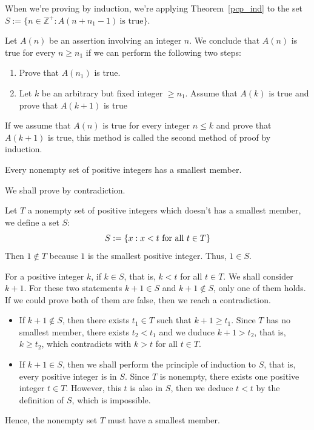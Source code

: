     \begin{remarkenv}
		When we're proving by induction, we're applying Theorem~\ref{pcp_ind} to the set $S:=\{n\in \mathbb{Z}^+:A(n+n_1-1)\ \text{is true}\}$.
	\end{remarkenv}
	\begin{methodenv}\label{prove_by_indu}
		Let $A(n)$ be an assertion involving an integer $n$. We conclude that $A(n)$ is true for every $n\ge n_1$ if we can perform the following two steps:
		\begin{enumerate}
			\item Prove that $A(n_1)$ is true.
			\item Let $k$ be an arbitrary but fixed integer $\ge n_1$. Assume that $A(k)$ is true and prove that $A(k+1)$ is true
		\end{enumerate}
	\end{methodenv}
	\begin{remarkenv}
		If we assume that $A(n)$ is true for every integer $n\le k$ and prove that $A(k+1)$ is true, this method is called the second method of proof by induction.
	\end{remarkenv}
	\begin{theoremenv}\label{pcp_wod}
		Every nonempty set of positive integers has a smallest member.
	\end{theoremenv}
	\begin{proofenv}
		We shall prove by contradiction.
		
		Let $T$ a nonempty set of positive integers which doesn't has a smallest member, we define a set $S$:
		\begin{equation}
			S:=\{x:x<t\text{ for all } t \in T\}\notag
		\end{equation}
		Then $1\notin T$ because $1$ is the smallest positive integer. Thus, $1 \in S$. 
		
		For a positive integer $k$, if $k\in S$, that is, $k<t$ for all $t\in T$. We shall consider $k+1$. For these two statements $k+1\in S$ and $k+1 \notin S$, only one of them holds. If we could prove both of them are false, then we reach a contradiction. 
		\begin{itemize}
            \item If $k+1 \notin S$, then there exists $t_1\in T$ such that $k+1\ge t_1$. Since $T$ has no smallest member, there exists $t_2 < t_1$ and we duduce $k+1>t_2$, that is, $k \ge t_2$, which contradicts with $k>t$ for all $t\in T$. 
            		
            \item If $k+1\in S$, then we shall perform the principle of induction to $S$, that is, every positive integer is in $S$. Since $T$ is nonempty, there exists one positive integer $t\in T$. However, this $t$ is also in $S$, then we deduce $t<t$ by the definition of $S$, which is impossible.
            		
        \end{itemize}
		Hence, the nonempty set $T$ must have a smallest member.
	\end{proofenv}
